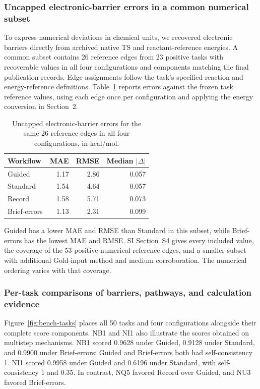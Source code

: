 \subsubsection{Uncapped electronic-barrier errors in a common numerical subset}

To express numerical deviations in chemical units, we recovered electronic barriers directly from archived native TS and reactant-reference energies. A common subset contains 26 reference edges from 23 positive tasks with recoverable values in all four configurations and components matching the final publication records. Edge assignments follow the task's specified reaction and energy-reference definitions. Table~\ref{tab:uncapped-barrier-errors} reports errors against the frozen task reference values, using each edge once per configuration and applying the energy conversion in Section~2.

\begin{table}[tbp]
\centering\small
\caption{Uncapped electronic-barrier errors for the same 26 reference edges in all four configurations, in kcal/mol.}
\label{tab:uncapped-barrier-errors}
\begin{tabular}{lrrr}
\toprule
Workflow & MAE & RMSE & Median $|\Delta|$ \\
\midrule
Guided & 1.17 & 2.86 & 0.057 \\
Standard & 1.54 & 4.64 & 0.057 \\
Record & 1.58 & 5.71 & 0.073 \\
Brief-errors & 1.13 & 2.31 & 0.099 \\
\bottomrule
\end{tabular}
\end{table}

Guided has a lower MAE and RMSE than Standard in this subset, while Brief-errors has the lowest MAE and RMSE. SI Section~S4 gives every included value, the coverage of the 53 positive numerical reference edges, and a smaller subset with additional Gold-input method and medium corroboration. The numerical ordering varies with that coverage.

\subsubsection{Per-task comparisons of barriers, pathways, and calculation evidence}

Figure~\ref{fig:bench-tasks} places all 50 tasks and four configurations alongside their complete score components. NB1 and NI1 also illustrate the scores obtained on multistep mechanisms. NB1 scored 0.9628 under Guided, 0.9128 under Standard, and 0.9900 under Brief-errors; Guided and Brief-errors both had self-consistency 1. NI1 scored 0.9958 under Guided and 0.6196 under Standard, with self-consistency 1 and 0.35. In contrast, NQ5 favored Record over Guided, and NU3 favored Brief-errors.

